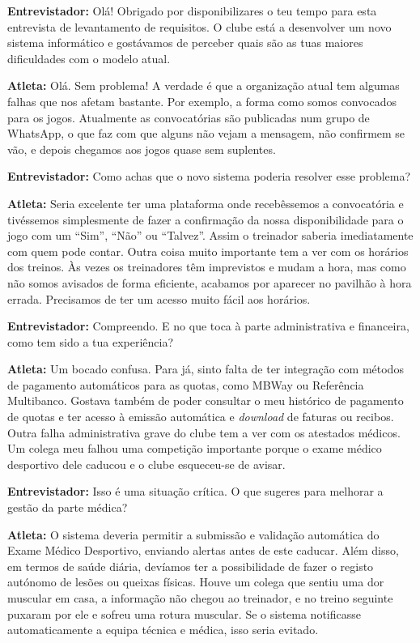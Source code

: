\begin{tcolorbox}[colback=white, colframe=gray!50, arc=1mm, title=\textbf{Transcrição da Entrevista ao Atleta}]
\small
\textbf{Entrevistador:} Olá! Obrigado por disponibilizares o teu tempo para esta entrevista de levantamento de requisitos. O clube está a desenvolver um novo sistema informático e gostávamos de perceber quais são as tuas maiores dificuldades com o modelo atual.

\textbf{Atleta:} Olá. Sem problema! A verdade é que a organização atual tem algumas falhas que nos afetam bastante. Por exemplo, a forma como somos convocados para os jogos. Atualmente as convocatórias são publicadas num grupo de WhatsApp, o que faz com que alguns não vejam a mensagem, não confirmem se vão, e depois chegamos aos jogos quase sem suplentes.

\textbf{Entrevistador:} Como achas que o novo sistema poderia resolver esse problema?

\textbf{Atleta:} Seria excelente ter uma plataforma onde recebêssemos a convocatória e tivéssemos simplesmente de fazer a confirmação da nossa disponibilidade para o jogo com um ``Sim'', ``Não'' ou ``Talvez''. Assim o treinador saberia imediatamente com quem pode contar. Outra coisa muito importante tem a ver com os horários dos treinos. Às vezes os treinadores têm imprevistos e mudam a hora, mas como não somos avisados de forma eficiente, acabamos por aparecer no pavilhão à hora errada. Precisamos de ter um acesso muito fácil aos horários.

\textbf{Entrevistador:} Compreendo. E no que toca à parte administrativa e financeira, como tem sido a tua experiência?

\textbf{Atleta:} Um bocado confusa. Para já, sinto falta de ter integração com métodos de pagamento automáticos para as quotas, como MBWay ou Referência Multibanco. Gostava também de poder consultar o meu histórico de pagamento de quotas e ter acesso à emissão automática e \textit{download} de faturas ou recibos. Outra falha administrativa grave do clube tem a ver com os atestados médicos. Um colega meu falhou uma competição importante porque o exame médico desportivo dele caducou e o clube esqueceu-se de avisar.

\textbf{Entrevistador:} Isso é uma situação crítica. O que sugeres para melhorar a gestão da parte médica?

\textbf{Atleta:} O sistema deveria permitir a submissão e validação automática do Exame Médico Desportivo, enviando alertas antes de este caducar. Além disso, em termos de saúde diária, devíamos ter a possibilidade de fazer o registo autónomo de lesões ou queixas físicas. Houve um colega que sentiu uma dor muscular em casa, a informação não chegou ao treinador, e no treino seguinte puxaram por ele e sofreu uma rotura muscular. Se o sistema notificasse automaticamente a equipa técnica e médica, isso seria evitado.


\end{tcolorbox}
